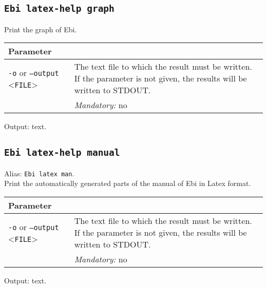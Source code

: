 {\subsection{\texttt{Ebi latex-help graph}}
\label{command:Ebi latex-help graph}
Print the graph of Ebi.\\
\begin{tabularx}{\linewidth}{lX}
\toprule
Parameter \\\midrule
\texttt{-o} or \texttt{--output} <\texttt{FILE}> &
The text file to which the result must be written. If the parameter is not given, the results will be written to STDOUT.\\
&\textit{Mandatory:} \quad no\\
\bottomrule
\end{tabularx}
Output: text.
\subsection{\texttt{Ebi latex-help manual}}
\label{command:Ebi latex-help manual}
Alias: \texttt{Ebi latex man}.\\
Print the automatically generated parts of the manual of Ebi in Latex format.\\
\begin{tabularx}{\linewidth}{lX}
\toprule
Parameter \\\midrule
\texttt{-o} or \texttt{--output} <\texttt{FILE}> &
The text file to which the result must be written. If the parameter is not given, the results will be written to STDOUT.\\
&\textit{Mandatory:} \quad no\\
\bottomrule
\end{tabularx}
Output: text.
}
